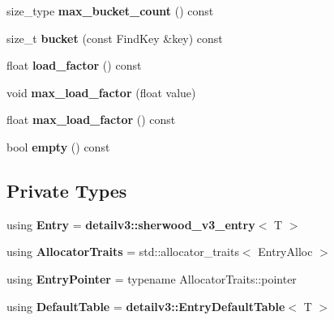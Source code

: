 \begin{DoxyCompactItemize}
\item 
size\+\_\+type {\bfseries max\+\_\+bucket\+\_\+count} () const \label{classska_1_1detailv3_1_1sherwood__v3__table_a04e8b09b65d4d0894407bd8879f5c2fb}

\item 
size\+\_\+t {\bfseries bucket} (const Find\+Key \&key) const \label{classska_1_1detailv3_1_1sherwood__v3__table_a42cc5cecfbb20230ee189f28b65fca7c}

\item 
float {\bfseries load\+\_\+factor} () const \label{classska_1_1detailv3_1_1sherwood__v3__table_a63a605a0c204472c3018da2921b87cdc}

\item 
void {\bfseries max\+\_\+load\+\_\+factor} (float value)\label{classska_1_1detailv3_1_1sherwood__v3__table_adc1c8ab152d3934157b3d22a71dcab3e}

\item 
float {\bfseries max\+\_\+load\+\_\+factor} () const \label{classska_1_1detailv3_1_1sherwood__v3__table_a213a3854ab4aab689ec301185f1e1446}

\item 
bool {\bfseries empty} () const \label{classska_1_1detailv3_1_1sherwood__v3__table_a4957a0b7d6c8f720efbaf7d310feb60e}

\end{DoxyCompactItemize}
\subsection*{Private Types}
\begin{DoxyCompactItemize}
\item 
using {\bfseries Entry} = {\bf detailv3\+::sherwood\+\_\+v3\+\_\+entry}$<$ T $>$\label{classska_1_1detailv3_1_1sherwood__v3__table_a73c15a0a60030b8f148d40f1aecab2d8}

\item 
using {\bfseries Allocator\+Traits} = std\+::allocator\+\_\+traits$<$ Entry\+Alloc $>$\label{classska_1_1detailv3_1_1sherwood__v3__table_ac1603d09ba4eb53eb927734a7b640ede}

\item 
using {\bfseries Entry\+Pointer} = typename Allocator\+Traits\+::pointer\label{classska_1_1detailv3_1_1sherwood__v3__table_a6e8384a98f42d8d39b44f0bfcad73be5}

\item 
using {\bfseries Default\+Table} = {\bf detailv3\+::\+Entry\+Default\+Table}$<$ T $>$\label{classska_1_1detailv3_1_1sherwood__v3__table_aa9c5b669279d50c3439ab203bc30ab7a}

\end{DoxyCompactItemize}
